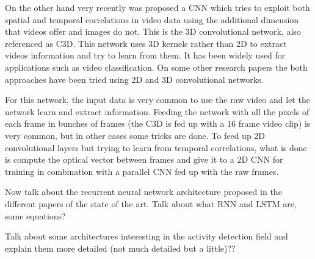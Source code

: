 
On the other hand very recently was proposed a CNN which tries to exploit both spatial and temporal correlations in video data using the additional dimension that videos offer and images do not. This is the 3D convolutional network, also referenced as C3D\cite{tran2014learning}. This network uses 3D kernels rather than 2D to extract videos information and try to learn from them. It has been widely used\cite{baccouche2011sequential}\cite{tran2015deep}\cite{tran2014learning}\cite{shoutemporal} for applications such as video classification. On some other research papers\cite{Yao_2015_ICCV}\cite{zhang2016modelling} the both approaches have been tried using 2D and 3D convolutional networks.

For this network, the input data is very common to use the raw video and let the network learn and extract information. Feeding the network with all the pixels of each frame in bunches of frames (the C3D is fed up with a 16 frame video clip) is very common, but in other cases some tricks are done. To feed up 2D convolutional layers but trying to learn from temporal correlations, what is done is compute the optical vector between frames and give it to a 2D CNN for training in combination with a parallel CNN fed up with the raw frames\cite{Ng_2015_CVPR}\cite{Yao_2015_ICCV}.


Now talk about the recurrent neural network architecture proposed in the different papers of the state of the art. Talk about what RNN and LSTM are, some equations?


Talk about some architectures interesting in the activity detection field and explain them more detailed (not much detailed but a little)??

